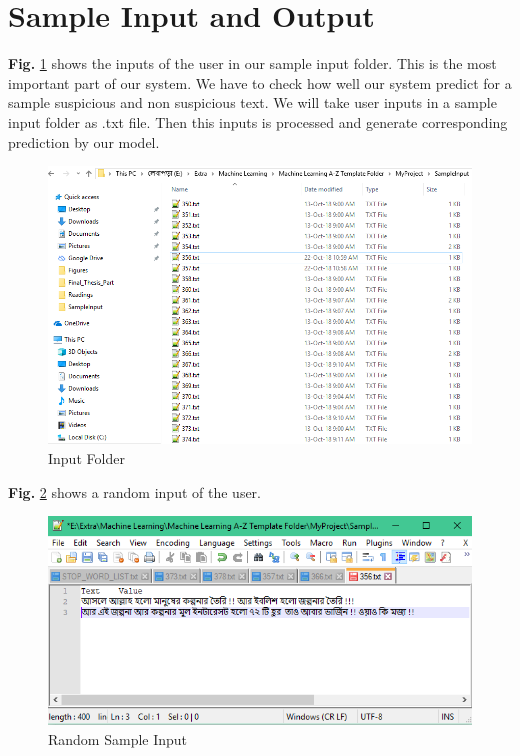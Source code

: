 \section{Sample Input and Output}
\textbf{Fig.} \ref{fig:smi} shows the inputs of the user in our sample input folder. This is the most important part of our system. We have to check how well our system predict for a sample suspicious and non suspicious text. We will take user inputs in a sample input folder as .txt file. Then this inputs is processed and generate corresponding prediction by our model.\par\vspace{0.5cm}
\begin{figure}[h!]
    \centering
    \includegraphics[scale=0.65]{Figures/sample_inp.PNG}
    \caption{Input Folder}
    \label{fig:smi}
\end{figure}
\par\noindent
\vspace{0.3cm}
\textbf{Fig.} \ref{fig:ui} shows a random input of the user.
\begin{figure}[h!]
    \centering
    \includegraphics[scale=0.7]{Figures/input_s.PNG}
    \caption{Random Sample Input}
    \label{fig:ui}
\end{figure}
